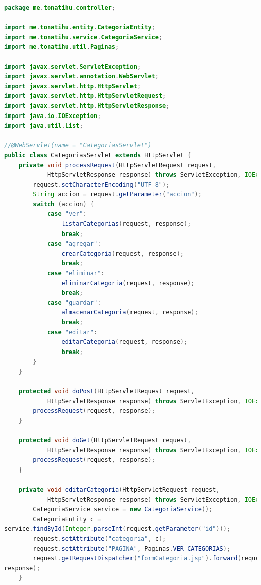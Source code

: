 \documentclass[a4paper,12pt]{article}
\begin{document}
\begin{lstlisting}[language=Java, style=customJava, 
caption={CategoriasServlet.java}, 
captionpos=b,basicstyle=\fontfamily{cmss}\small]
package me.tonatihu.controller;

import me.tonatihu.entity.CategoriaEntity;
import me.tonatihu.service.CategoriaService;
import me.tonatihu.util.Paginas;

import javax.servlet.ServletException;
import javax.servlet.annotation.WebServlet;
import javax.servlet.http.HttpServlet;
import javax.servlet.http.HttpServletRequest;
import javax.servlet.http.HttpServletResponse;
import java.io.IOException;
import java.util.List;

//@WebServlet(name = "CategoriasServlet")
public class CategoriasServlet extends HttpServlet {
    private void processRequest(HttpServletRequest request,
            HttpServletResponse response) throws ServletException, IOException {
        request.setCharacterEncoding("UTF-8");
        String accion = request.getParameter("accion");
        switch (accion) {
            case "ver":
                listarCategorias(request, response);
                break;
            case "agregar":
                crearCategoria(request, response);
                break;
            case "eliminar":
                eliminarCategoria(request, response);
                break;
            case "guardar":
                almacenarCategoria(request, response);
                break;
            case "editar":
                editarCategoria(request, response);
                break;
        }
    }

    protected void doPost(HttpServletRequest request,
            HttpServletResponse response) throws ServletException, IOException {
        processRequest(request, response);
    }

    protected void doGet(HttpServletRequest request,
            HttpServletResponse response) throws ServletException, IOException {
        processRequest(request, response);
    }

    private void editarCategoria(HttpServletRequest request,
            HttpServletResponse response) throws ServletException, IOException {
        CategoriaService service = new CategoriaService();
        CategoriaEntity c = 
service.findById(Integer.parseInt(request.getParameter("id")));
        request.setAttribute("categoria", c);
        request.setAttribute("PAGINA", Paginas.VER_CATEGORIAS);
        request.getRequestDispatcher("formCategoria.jsp").forward(request, 
response);
    }


\end{lstlisting}
\end{document}
